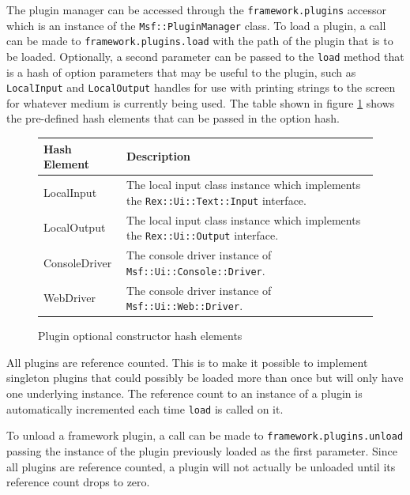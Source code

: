 \documentclass{report}
\begin{document}
\par
The plugin manager can be accessed through the
\texttt{framework.plugins} accessor which is an instance of the
\texttt{Msf::PluginManager} class. To load a plugin, a call can be
made to \texttt{framework.plugins.load} with the path of the plugin
that is to be loaded.  Optionally, a second parameter can be passed
to the \texttt{load} method that is a hash of option parameters that
may be useful to the plugin, such as \texttt{LocalInput} and
\texttt{LocalOutput} handles for use with printing strings to the
screen for whatever medium is currently being used.  The table shown
in figure \ref{fig-table-plugin-hash} shows the pre-defined hash
elements that can be passed in the option hash.

\begin{figure}[h]
\begin{center}
\begin{tabular}{|l|p{3.5in}|}
\hline
\textbf{Hash Element} & \textbf{Description} \\
\hline
LocalInput & The local input class instance which implements the \texttt{Rex::Ui::Text::Input} interface. \\
\hline
LocalOutput & The local input class instance which implements the \texttt{Rex::Ui::Output} interface. \\
\hline
ConsoleDriver & The console driver instance of \texttt{Msf::Ui::Console::Driver}. \\
\hline
WebDriver & The console driver instance of \texttt{Msf::Ui::Web::Driver}. \\
\hline
\end{tabular}
\caption{Plugin optional constructor hash elements}
\label{fig-table-plugin-hash}
\end{center}
\end{figure}

\par
All plugins are reference counted.  This is to make it possible to
implement singleton plugins that could possibly be loaded more than
once but will only have one underlying instance.  The reference
count to an instance of a plugin is automatically incremented each
time \texttt{load} is called on it.

\par
To unload a framework plugin, a call can be made to
\texttt{framework.plugins.unload} passing the instance of the plugin
previously loaded as the first parameter.  Since all plugins are
reference counted, a plugin will not actually be unloaded until its
reference count drops to zero.
\end{document}
